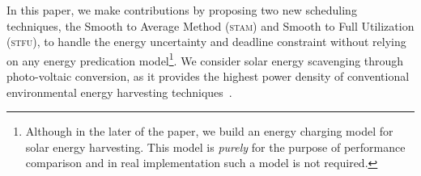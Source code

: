In this paper, we make contributions by proposing two new scheduling techniques, the Smooth to Average Method (\textsc{stam}) and Smooth to Full Utilization (\textsc{stfu}), to handle the energy uncertainty and deadline constraint without relying on any energy predication model\footnote{Although in the later of the paper, we build an energy charging model for solar energy harvesting. This model is \textit{purely} for the purpose of performance comparison and in real implementation such a model is not required.}.
We consider solar energy scavenging through photo-voltaic conversion, as it provides the highest power density of conventional environmental energy harvesting techniques~\cite{raghunathan2005design}. 

